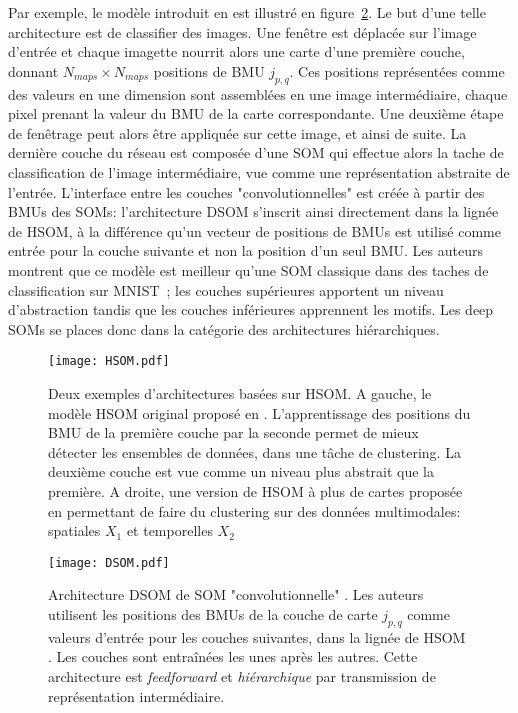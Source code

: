 \documentclass[../main]{subfiles}
\begin{document}
Par exemple, le modèle introduit en \cite{Liu2015DeepSM} est illustré en figure~\ref{fig:dsom}.
Le but d'une telle architecture est de classifier des images. Une fenêtre est déplacée sur l'image d'entrée et chaque imagette nourrit alors une carte d'une première couche, donnant $N_{maps}  \times N_{maps}$ positions de BMU $j_{p,q}$. Ces positions représentées comme des valeurs en une dimension sont assemblées en une image intermédiaire, chaque pixel prenant la valeur du BMU de la carte correspondante. Une deuxième étape de fenêtrage peut alors être appliquée sur cette image, et ainsi de suite. La dernière couche du réseau est composée d'une SOM qui effectue alors la tache de classification de l'image intermédiaire, vue comme une représentation abstraite  de l'entrée.
L'interface entre les couches "convolutionnelles" est créée à partir des BMUs des SOMs: l'architecture DSOM s'inscrit ainsi directement dans la lignée de HSOM, à la différence qu'un vecteur de positions de BMUs est utilisé comme entrée pour la couche suivante et non la position d'un seul BMU.
Les auteurs montrent que ce modèle est meilleur qu'une SOM classique dans des taches de classification sur MNIST~; les couches supérieures apportent un niveau d'abstraction tandis que les couches inférieures apprennent les motifs.
Les deep SOMs se places donc dans la catégorie des architectures hiérarchiques.

\begin{figure}
    \centering
    \texttt{[image: HSOM.pdf]}
    \caption{Deux exemples d'architectures basées sur HSOM. A gauche, le modèle HSOM original proposé en \cite{lampinen_clustering_1992}. L'apprentissage des positions du BMU de la première couche par la seconde permet de mieux détecter les ensembles de données, dans une tâche de clustering. La deuxième couche est vue comme un niveau plus abstrait que la première. A droite, une version de HSOM à plus de cartes proposée en \cite{hagenauer_hierarchical_2013} permettant de faire du clustering sur des données multimodales: spatiales $X_1$ et temporelles $X_2$
    \label{fig:hsom}}
\end{figure}

\begin{figure}
    \texttt{[image: DSOM.pdf]}
    \caption{Architecture DSOM de SOM "convolutionnelle" \cite{liu_deep_2015}. Les auteurs utilisent les positions des BMUs de la couche de carte $j_{p,q}$ comme valeurs d'entrée pour les couches suivantes, dans la lignée de HSOM \cite{lampinen_clustering_1992}. Les couches sont entraînées les unes après les autres. Cette architecture est \emph{feedforward} et \emph{hiérarchique} par transmission de représentation intermédiaire. \label{fig:dsom}}
\end{figure}
\end{document}
